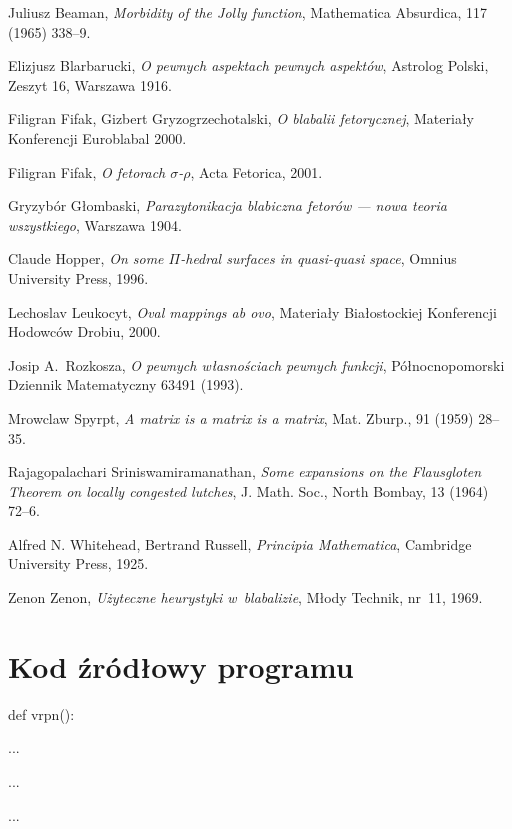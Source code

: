 \documentclass[licencjacka]{pracamgr}
\begin{document}
\begin{thebibliography}{99}

 Juliusz Beaman, \textit{Morbidity of the Jolly
    function}, Mathematica Absurdica, 117 (1965) 338--9.

 Elizjusz Blarbarucki, \textit{O pewnych
    aspektach pewnych aspektów}, Astrolog Polski, Zeszyt 16, Warszawa
  1916.

 Filigran Fifak, Gizbert Gryzogrzechotalski,
  \textit{O blabalii fetorycznej}, Materiały Konferencji Euroblabal
  2000.

 Filigran Fifak, \textit{O fetorach
    $\sigma$-$\rho$}, Acta Fetorica, 2001.

 Gryzybór Głombaski, \textit{Parazytonikacja
    blabiczna fetorów --- nowa teoria wszystkiego}, Warszawa 1904.

 Claude Hopper, \textit{On some $\Pi$-hedral
    surfaces in quasi-quasi space}, Omnius University Press, 1996.

 Lechoslav Leukocyt, \textit{Oval mappings ab ovo},
  Materiały Białostockiej Konferencji Hodowców Drobiu, 2000.

 Josip A.~Rozkosza, \textit{O pewnych własnościach
    pewnych funkcji}, Północnopomorski Dziennik Matematyczny 63491
  (1993).

 Mrowclaw Spyrpt, \textit{A matrix is a matrix
    is a matrix}, Mat. Zburp., 91 (1959) 28--35.

 Rajagopalachari Sriniswamiramanathan,
  \textit{Some expansions on the Flausgloten Theorem on locally
    congested lutches}, J. Math.  Soc., North Bombay, 13 (1964) 72--6.

 Alfred N. Whitehead, Bertrand Russell,
  \textit{Principia Mathematica}, Cambridge University Press, 1925.

 Zenon Zenon, \textit{Użyteczne heurystyki
    w~blabalizie}, Młody Technik, nr~11, 1969.

\end{thebibliography}

\chapter*{Kod źródłowy programu}

def vrpn():

...

...

...
\end{document}
